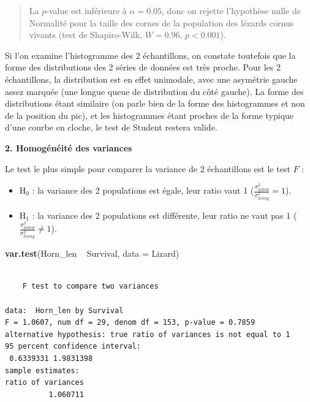 \documentclass[a4paperpaper,]{article}
\newenvironment{Shaded}{\begin{snugshade}}{\end{snugshade}}
\newcommand{\DataTypeTok}[1]{\textcolor[rgb]{0.00,0.34,0.68}{#1}}
\newcommand{\KeywordTok}[1]{\textcolor[rgb]{0.12,0.11,0.11}{\textbf{#1}}}
\newcommand{\NormalTok}[1]{\textcolor[rgb]{0.12,0.11,0.11}{#1}}
\newcommand{\OperatorTok}[1]{\textcolor[rgb]{0.12,0.11,0.11}{#1}}
\newcommand{\StringTok}[1]{\textcolor[rgb]{0.75,0.01,0.01}{#1}}
\providecommand{\tightlist}{%
  \setlength{\itemsep}{0pt}\setlength{\parskip}{0pt}}
\begin{document}
\begin{quote}
La \(p\)-value est inférieure à \(\alpha = 0.05\), donc on rejette l'hypothèse nulle de Normalité pour la taille des cornes de la population des lézards cornus vivants (test de Shapiro-Wilk, \(W = 0.96\), \(p < 0.001\)).
\end{quote}

Si l'on examine l'histogramme des 2 échantillons, on constate toutefois que la forme des distributions des 2 séries de données est très proche. Pour les 2 échantillons, la distribution est en effet unimodale, avec une asymétrie gauche assez marquée (une longue queue de distribution du côté gauche). La forme des distributions étant similaire (on parle bien de la forme des histogrammes et non de la position du pic), et les histogrammes étant proches de la forme typique d'une courbe en cloche, le test de Student restera valide.

\textbf{2. Homogénéité des variances}

Le test le plus simple pour comparer la variance de 2 échantillons est le test \(F\) :

\begin{itemize}
\tightlist
\item
  H\(_0\) : la variance des 2 populations est égale, leur ratio vaut 1 (\(\frac{\sigma^2_{killed}}{\sigma^2_{living}} = 1\)).
\item
  H\(_1\) : la variance des 2 populations est différente, leur ratio ne vaut pas 1 (\(\frac{\sigma^2_{killed}}{\sigma^2_{living}} \neq 1\)).
\end{itemize}

\begin{Shaded}
\begin{Highlighting}[]
\KeywordTok{var.test}\NormalTok{(Horn_len }\OperatorTok{~}\StringTok{ }\NormalTok{Survival, }\DataTypeTok{data =}\NormalTok{ Lizard)}
\end{Highlighting}
\end{Shaded}

\begin{verbatim}

    F test to compare two variances

data:  Horn_len by Survival
F = 1.0607, num df = 29, denom df = 153, p-value = 0.7859
alternative hypothesis: true ratio of variances is not equal to 1
95 percent confidence interval:
 0.6339331 1.9831398
sample estimates:
ratio of variances 
          1.060711 
\end{verbatim}
\end{document}
